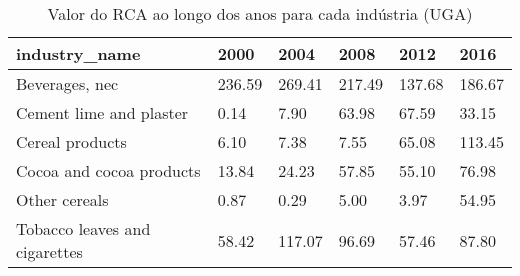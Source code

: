 \begin{table}
\centering
\caption{Valor do RCA ao longo dos anos para cada indústria (UGA)}
\begin{tabular}{p{6cm}p{1.5cm}p{1.5cm}p{1.5cm}p{1.5cm}p{1.5cm}}
\toprule
                industry\_name &   2000 &   2004 &   2008 &   2012 &   2016 \\
\midrule
               Beverages, nec & 236.59 & 269.41 & 217.49 & 137.68 & 186.67 \\
      Cement lime and plaster &   0.14 &   7.90 &  63.98 &  67.59 &  33.15 \\
              Cereal products &   6.10 &   7.38 &   7.55 &  65.08 & 113.45 \\
     Cocoa and cocoa products &  13.84 &  24.23 &  57.85 &  55.10 &  76.98 \\
                Other cereals &   0.87 &   0.29 &   5.00 &   3.97 &  54.95 \\
Tobacco leaves and cigarettes &  58.42 & 117.07 &  96.69 &  57.46 &  87.80 \\
\bottomrule
\end{tabular}
\end{table}

